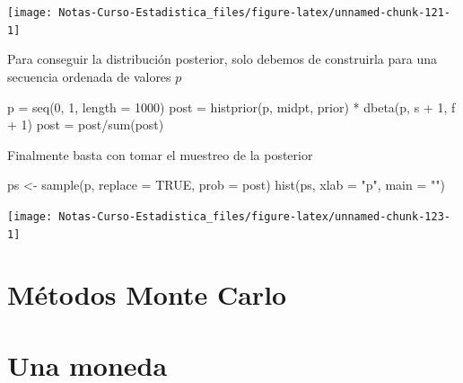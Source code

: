 \documentclass[
  12pt,
]{book}
\newenvironment{Shaded}{\begin{snugshade}}{\end{snugshade}}
\newcommand{\AttributeTok}[1]{\textcolor[rgb]{0.77,0.63,0.00}{#1}}
\newcommand{\ConstantTok}[1]{\textcolor[rgb]{0.00,0.00,0.00}{#1}}
\newcommand{\DecValTok}[1]{\textcolor[rgb]{0.00,0.00,0.81}{#1}}
\newcommand{\FunctionTok}[1]{\textcolor[rgb]{0.00,0.00,0.00}{#1}}
\newcommand{\NormalTok}[1]{#1}
\newcommand{\OtherTok}[1]{\textcolor[rgb]{0.56,0.35,0.01}{#1}}
\newcommand{\SpecialCharTok}[1]{\textcolor[rgb]{0.00,0.00,0.00}{#1}}
\newcommand{\StringTok}[1]{\textcolor[rgb]{0.31,0.60,0.02}{#1}}
\theoremstyle{definition}
\theoremstyle{definition}
\theoremstyle{definition}
\theoremstyle{remark}
\begin{document}
\begin{center}\texttt{[image: Notas-Curso-Estadistica\_files/figure-latex/unnamed-chunk-121-1]} \end{center}

Para conseguir la distribución posterior, solo debemos de construirla para una secuencia ordenada de valores \(p\)

\begin{Shaded}
\begin{Highlighting}[]
\NormalTok{p }\OtherTok{=} \FunctionTok{seq}\NormalTok{(}\DecValTok{0}\NormalTok{, }\DecValTok{1}\NormalTok{, }\AttributeTok{length =} \DecValTok{1000}\NormalTok{)}
\NormalTok{post }\OtherTok{=} \FunctionTok{histprior}\NormalTok{(p, midpt, prior) }\SpecialCharTok{*} \FunctionTok{dbeta}\NormalTok{(p, s }\SpecialCharTok{+} \DecValTok{1}\NormalTok{, }
\NormalTok{    f }\SpecialCharTok{+} \DecValTok{1}\NormalTok{)}
\NormalTok{post }\OtherTok{=}\NormalTok{ post}\SpecialCharTok{/}\FunctionTok{sum}\NormalTok{(post)}
\end{Highlighting}
\end{Shaded}

Finalmente basta con tomar el muestreo de la posterior

\begin{Shaded}
\begin{Highlighting}[]
\NormalTok{ps }\OtherTok{\textless{}{-}} \FunctionTok{sample}\NormalTok{(p, }\AttributeTok{replace =} \ConstantTok{TRUE}\NormalTok{, }\AttributeTok{prob =}\NormalTok{ post)}
\FunctionTok{hist}\NormalTok{(ps, }\AttributeTok{xlab =} \StringTok{"p"}\NormalTok{, }\AttributeTok{main =} \StringTok{""}\NormalTok{)}
\end{Highlighting}
\end{Shaded}

\begin{center}\texttt{[image: Notas-Curso-Estadistica\_files/figure-latex/unnamed-chunk-123-1]} \end{center}

\hypertarget{muxe9todos-monte-carlo}{%
\section{Métodos Monte Carlo}\label{muxe9todos-monte-carlo}}

\hypertarget{una-moneda}{%
\section{Una moneda}\label{una-moneda}}
\end{document}
